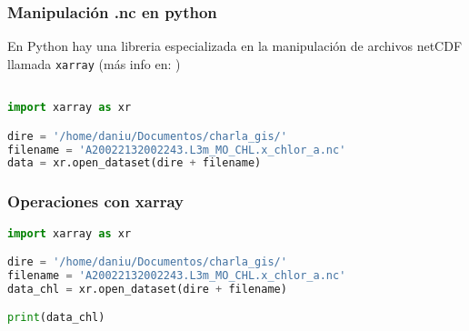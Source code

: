 \documentclass{beamer}
\begin{document}
\begin{frame}[t,fragile]
\frametitle{Manipulación .nc en python}

En Python hay una libreria especializada en la manipulación de archivos netCDF llamada \texttt{xarray} (más info en: \href{http://xarray.pydata.org/en/stable/}{})

\pause
\begin{lstlisting}[language=python, basicstyle=\scriptsize]

import xarray as xr

dire = '/home/daniu/Documentos/charla_gis/'
filename = 'A20022132002243.L3m_MO_CHL.x_chlor_a.nc'
data = xr.open_dataset(dire + filename)

\end{lstlisting}


\begin{figure}
	
	
\end{figure}
\end{frame}


\begin{frame}[fragile]
\frametitle{Operaciones con xarray}

\begin{lstlisting}[language=python, basicstyle=\scriptsize]
import xarray as xr

dire = '/home/daniu/Documentos/charla_gis/'
filename = 'A20022132002243.L3m_MO_CHL.x_chlor_a.nc'
data_chl = xr.open_dataset(dire + filename)

print(data_chl)
\end{lstlisting}

\begin{figure}
	
	
\end{figure}

\end{frame}
\end{document}
